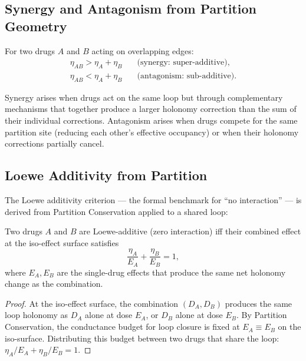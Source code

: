 \subsection{Synergy and Antagonism from Partition Geometry}
\label{subsec:ch09-synergy}

\begin{definition}
\label{def:ch09-synergy}
For two drugs $A$ and $B$ acting on overlapping edges:
\begin{align}
  \eta_{AB} > \eta_A + \eta_B &\quad\text{(synergy: super-additive)},
  \label{eq:ch09-synergy}\\
  \eta_{AB} < \eta_A + \eta_B &\quad\text{(antagonism: sub-additive)}.
  \label{eq:ch09-antagonism}
\end{align}
\end{definition}

Synergy arises when drugs act on the same loop but through complementary
mechanisms that together produce a larger holonomy correction than the sum
of their individual corrections.  Antagonism arises when drugs compete for
the same partition site (reducing each other's effective occupancy) or when
their holonomy corrections partially cancel.

\subsection{Loewe Additivity from Partition}
\label{subsec:ch09-loewe}

The Loewe additivity criterion --- the formal benchmark for ``no interaction''
--- is derived from Partition Conservation applied to a shared loop:

\begin{theorem}
\label{thm:ch09-loewe}
Two drugs $A$ and $B$ are Loewe-additive (zero interaction) iff their
combined effect at the iso-effect surface satisfies
\begin{equation}
  \frac{\eta_A}{E_A} + \frac{\eta_B}{E_B} = 1,
  \label{eq:ch09-loewe}
\end{equation}
where $E_A, E_B$ are the single-drug effects that produce the same net
holonomy change as the combination.
\end{theorem}

\begin{proof}
At the iso-effect surface, the combination $(D_A, D_B)$ produces the same
loop holonomy as $D_A$ alone at dose $E_A$, or $D_B$ alone at dose $E_B$.
By Partition Conservation, the conductance budget for loop closure is fixed
at $E_A \equiv E_B$ on the iso-surface.  Distributing this budget between
two drugs that share the loop: $\eta_A/E_A + \eta_B/E_B = 1$.
\end{proof}

